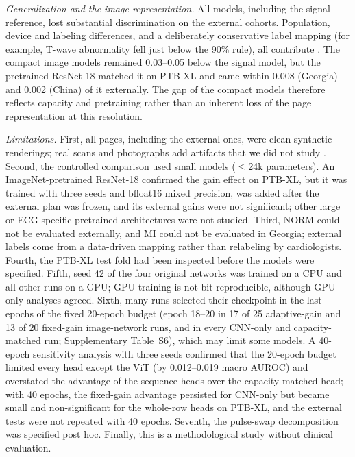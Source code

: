 \documentclass[journal]{IEEEtran}
\begin{document}
\emph{Generalization and the image representation.} All models, including the signal reference, lost substantial discrimination on the external cohorts. Population, device and labeling differences, and a deliberately conservative label mapping (for example, T-wave abnormality fell just below the 90\% rule), all contribute \cite{reyna2022issues}. The compact image models remained 0.03--0.05 below the signal model, but the pretrained ResNet-18 matched it on PTB-XL and came within 0.008 (Georgia) and 0.002 (China) of it externally. The gap of the compact models therefore reflects capacity and pretraining rather than an inherent loss of the page representation at this resolution.

\emph{Limitations.} First, all pages, including the external ones, were clean synthetic renderings; real scans and photographs add artifacts that we did not study \cite{shivashankara2024ecgimagekit,reyna2024challenge}. Second, the controlled comparison used small models ($\le$24k parameters). An ImageNet-pretrained ResNet-18 confirmed the gain effect on PTB-XL, but it was trained with three seeds and bfloat16 mixed precision, was added after the external plan was frozen, and its external gains were not significant; other large or ECG-specific pretrained architectures were not studied. Third, NORM could not be evaluated externally, and MI could not be evaluated in Georgia; external labels come from a data-driven mapping rather than relabeling by cardiologists. Fourth, the PTB-XL test fold had been inspected before the models were specified. Fifth, seed 42 of the four original networks was trained on a CPU and all other runs on a GPU; GPU training is not bit-reproducible, although GPU-only analyses agreed. Sixth, many runs selected their checkpoint in the last epochs of the fixed 20-epoch budget (epoch 18--20 in 17 of 25 adaptive-gain and 13 of 20 fixed-gain image-network runs, and in every CNN-only and capacity-matched run; Supplementary Table~S6), which may limit some models. A 40-epoch sensitivity analysis with three seeds confirmed that the 20-epoch budget limited every head except the ViT (by 0.012--0.019 macro AUROC) and overstated the advantage of the sequence heads over the capacity-matched head; with 40 epochs, the fixed-gain advantage persisted for CNN-only but became small and non-significant for the whole-row heads on PTB-XL, and the external tests were not repeated with 40 epochs. Seventh, the pulse-swap decomposition was specified post hoc. Finally, this is a methodological study without clinical evaluation.
\end{document}
